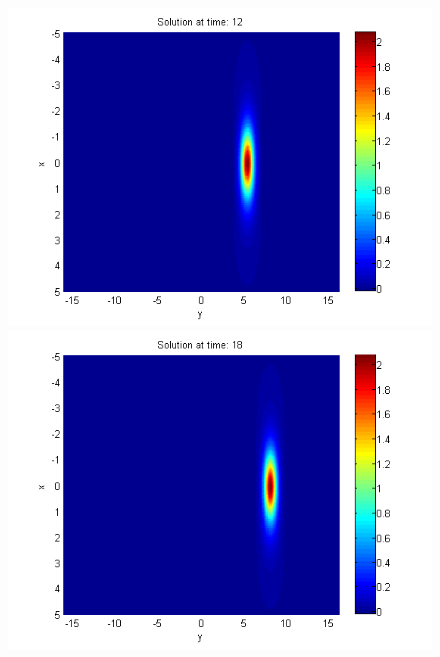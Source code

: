 \documentclass{article}
\begin{document}
\begin{figure}[ht]
\begin{minipage}[b]{0.30\linewidth}
		 \includegraphics[width=\linewidth]{../amitans/figures/solution_30x45_bt3_c045_T12.png}
	\end{minipage}
	\begin{minipage}[b]{0.30\linewidth}
		\includegraphics[width=\linewidth]{../amitans/figures/solution_30x45_bt3_c045_T18.png}
	\end{minipage}	
	\begin{minipage}[b]{0.30\linewidth}

\end{minipage}
\end{figure}
\end{document}
